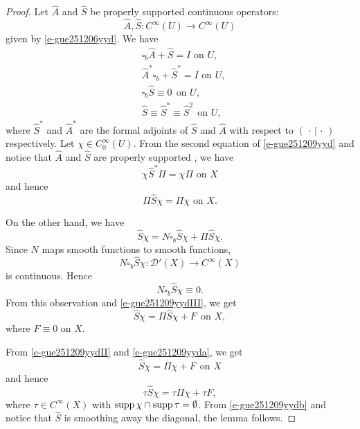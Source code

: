 \documentclass{article}
\newcommand{\mcd}{\mathcal D}
\newcommand{\To}{\rightarrow}
\begin{document}
\begin{proof}
Let $\hat A$ and $\hat S$ be properly supported continuous operators:
    \[\hat A, \hat S: C^\infty(U)\To C^\infty(U)\]
    given by \eqref{e-gue251206yyd}. We have
    \begin{equation}\label{e-gue251209yyd}
			\begin{split}
	&\mbox{$\square_b\hat{A}+\hat{S}=I$ on $U$},\\
    &\mbox{$\hat{A}^*\square_b+\hat{S}^*=I$ on $U$},\\
				&\square_b\hat{S}\equiv0\ \ \mbox{on $U$},\\
				&\hat{S}\equiv \hat{S}^*\equiv \hat{S}^2\ \ \mbox{on $U$},
			\end{split}
		\end{equation}
		where $\hat{S}^*$ and $\hat{A}^*$ are the formal adjoints of $\hat{S}$ and $\hat{A}$
		with respect to $(\,\cdot\,|\,\cdot\,)$ respectively.  
        Let $\chi\in C^\infty_0(U)$. 
From the second equation of \eqref{e-gue251209yyd} and notice that $\hat A$ and $\hat S$ are properly supported , we have 
\begin{equation}\label{e-gue251209yydI} \mbox{$\chi\hat{S}^*\Pi=\chi\Pi$ on $X$}
\end{equation}
and hence
\begin{equation}\label{e-gue251209yydII}
\mbox{$\Pi\hat{S}\chi=\Pi\chi$ on $X$}.\end{equation}

On the other hand, we have 
\begin{equation}\label{e-gue251209yydIII}\hat S\chi=N\square_b\hat S\chi+\Pi\hat S\chi.\end{equation}
Since $N$ maps smooth functions to smooth functions,
\[N\square_b\hat S\chi: \mcd'(X)\To C^\infty(X)\]
is continuous. Hence 
\[N\square_b\hat S\chi\equiv0.\]
From this observation and \eqref{e-gue251209yydIII}, we get 
\begin{equation}\label{e-gue251209yyda}\hat S\chi=\Pi\hat S\chi+F\ \ \mbox{on $X$},\end{equation}
where $F\equiv0$ on $X$. 

From \eqref{e-gue251209yydII} and \eqref{e-gue251209yyda}, we get 
\[\hat S\chi=\Pi\chi+F\ \ \mbox{on $X$}\]
and hence 
\begin{equation}\label{e-gue251209yydb}
\tau\hat S\chi=\tau\Pi\chi+\tau F,
\end{equation}
where $\tau\in C^\infty(X)$ with 
${\rm supp\,}\chi\cap{\rm supp\,}\tau=\emptyset$. From \eqref{e-gue251209yydb} and notice that $\hat S$ is smoothing away the diagonal, the lemma follows. 
\end{proof}
\end{document}
